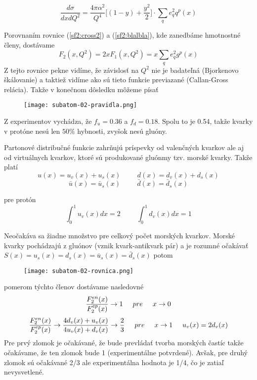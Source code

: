 \documentclass[../../main.tex]{subfiles}
\begin{document}
\begin{equation}
\frac{d\sigma}{dxdQ^2} = \frac{4\pi\alpha^2}{Q^4}\bigg[ (1-y)+\frac{y^2}{2} \bigg]\cdot \sum_q e^2_q q^p(x)
\label{sf2:cross2}
\end{equation}

Porovnaním rovnice (\ref{sf2:cross2}) a (\ref{sf2:blalbla}), kde zanedbáme hmotnostné členy, dostávame
$$ F_2(x,Q^2)=2xF_1(x,Q^2)=x\sum_q e^2_qg^p(x) $$
Z tejto rovnice pekne vidíme, že závislosť na $Q^2$ nie je badateľná (Bjorkenovo škálovanie) a taktiež vidíme ako sú tieto funkcie previazané (Callan-Gross relácia). Takže v konečnom dôsledku môžeme písať

\begin{figure}[!h]
\texttt{[image: subatom-02-pravidla.png]}
\centering
\end{figure}

Z experimentov vychádza, že $f_u=0.36$ a $f_d=0.18$. Spolu to je 0.54, takže kvarky v protóne nesú len $50\%$ hybnosti, zvyšok nesú gluóny.

Partonové distribučné funkcie zahrňujú príspevky od valenčných kvarkov ale aj od virtuálnych kvarkov, ktoré sú produkované gluónmy tzv. morské kvarky.
Takže platí
$$ u(x) = u_v(x)+u_s(x) \hspace{1cm} d(x) = d_v(x)+d_s(x) $$
$$ \bar{u}(x) = \bar{u}_s(x) \hspace{1cm} \bar{d}(x) = \bar{d}_s(x) $$

pre protón 
$$ \int_0^1u_v(x)dx=2 \hspace{1cm} \int_0^1d_v(x)dx=1 $$
 
Neočakáva sa žiadne množstvo pre celkový počet morských kvarkov. Morské kvarky pochádzajú z gluónov (vznik kvark-antikvark pár) a je rozumné očakávať 
$S(x)=u_s(x)=d_s(x)=\bar{u}_s(x)=\bar{d}_s(x)$ potom 

\begin{figure}[!h]
\texttt{[image: subatom-02-rovnica.png]}
\centering
\end{figure}

pomerom týchto členov dostávame nasledovné
$$ \frac{F^{en}_2(x)}{F^{ep}_2(x)}\rightarrow 1 \hspace{0.5cm} pre \hspace{0.5cm} x\rightarrow 0 $$
$$ \frac{F^{en}_2(x)}{F^{ep}_2(x)}\rightarrow \frac{4d_v(x)+u_v(x)}{4u_v(x)+d_v(x)} \rightarrow \frac{2}{3} \hspace{0.5cm} pre \hspace{0.5cm} x\rightarrow 1 \hspace{0.5cm} u_v(x)=2d_v(x) $$
Pre prvý zlomok je očakávané, že bude prevládať tvorba morských častíc takže očakávame, že ten zlomok bude 1 (experimentálne potvrdené). Avšak, pre druhý zlomok sú očakávané 2/3 ale experimentálna hodnota je 1/4, čo je zatiaľ nevysvetlené.
\end{document}

